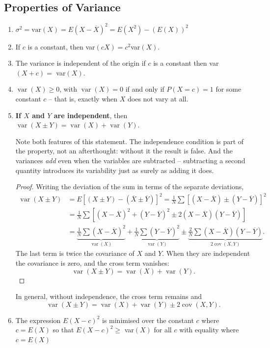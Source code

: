 \documentclass[11pt,a4paper]{article}
\theoremstyle{definition}
\begin{document}
\subsection{Properties of Variance}
\begin{enumerate}
\item $\sigma^2=\text{var}(X)=E(X-\overline{X})^2=E(X^2)-(E(X))^2$
\item If $c$ is a constant, then var$(cX)=c^2$var$(X)$.
\item The variance is independent of the origin if $c$ is a constant then var$(X+c)=$ var$(X)$.
\item $\operatorname{var}(X)\geq 0$, with $\operatorname{var}(X)=0$ if and only if $P(X=c)=1$ for some constant $c$ -- that is, exactly when $X$ does not vary at all.
\item \textbf{If $X$ and $Y$ are independent}, then
$\operatorname{var}(X\pm Y)=\operatorname{var}(X)+\operatorname{var}(Y)$.

Note both features of this statement. The independence condition is part of the property,
not an afterthought: without it the result is false. And the variances \emph{add} even when
the variables are subtracted -- subtracting a second quantity introduces its variability
just as surely as adding it does.

\begin{proof}
Writing the deviation of the sum in terms of the separate deviations,
\begin{align*}
\operatorname{var}(X\pm Y)
&=E[(X\pm Y)-(\overline{X}\pm \overline{Y})]^2
 =\frac{1}{N}\sum [(X-\overline{X})\pm(Y-\overline{Y})]^2\\
&=\frac{1}{N}\sum [(X-\overline{X})^2+(Y-\overline{Y})^2
   \pm 2(X-\overline{X})(Y-\overline{Y})]\\
&=\underbrace{\frac{1}{N}\sum (X-\overline{X})^2}_{\operatorname{var}(X)}
 +\underbrace{\frac{1}{N}\sum (Y-\overline{Y})^2}_{\operatorname{var}(Y)}
 \pm \underbrace{\frac{2}{N}\sum (X-\overline{X})(Y-\overline{Y})}_{2\operatorname{cov}(X,Y)}.
\end{align*}
The last term is twice the covariance of $X$ and $Y$. When they are independent the
covariance is zero, and the cross term vanishes:
\[\operatorname{var}(X\pm Y)=\operatorname{var}(X)+\operatorname{var}(Y).\]
\end{proof}

In general, without independence, the cross term remains and
\[\operatorname{var}(X\pm Y)=\operatorname{var}(X)+\operatorname{var}(Y)\pm 2\operatorname{cov}(X,Y).\]

\item The expression $E(X-c)^2$ is minimised over the constant $c$ where $c=E(X)$ so that $E(X-c)^2\geq$ var$(X)$ for all $c$ with equality where $c=E(X)$\\
\end{enumerate}
\end{document}

